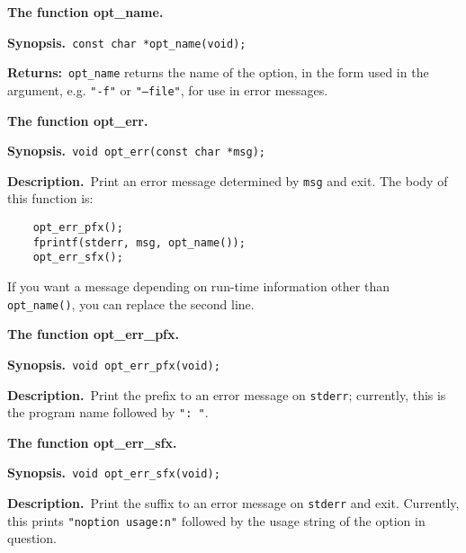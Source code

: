 \documentclass{article}
\newenvironment{chunk}[1]
{\par\smallskip\noindent\textbf{#1.}\par\nopagebreak}
{\par\smallskip}
\renewcommand{\tt}{\texttt}
\newcommand{\synopsis}{\par\noindent\textbf{Synopsis.}}
\newcommand{\descr}{\par\noindent\textbf{Description.}\ }
\newcommand{\return}{\par\noindent\textbf{Returns:}\ }
\newcommand{\bsl}{\symbol{92}}
\begin{document}
\begin{chunk}{The function opt\_name}
  \synopsis\verb+ const char *opt_name(void);+
  \return \tt{opt\_name} returns the name of the option, in
  the form used in the argument, e.g. \tt{"-f"} or \tt{"--file"}, for
  use in error messages.
\end{chunk}
\begin{chunk}{The function opt\_err}
  \synopsis\verb+ void opt_err(const char *msg);+
  \descr Print an error message determined by \tt{msg} and exit. The
  body of this function is:
\begin{verbatim}
    opt_err_pfx();
    fprintf(stderr, msg, opt_name());
    opt_err_sfx();
\end{verbatim}
  If you want a message depending on run-time information other than
  \tt{opt\_name()}, you can replace the second line.
\end{chunk}
\begin{chunk} {The function opt\_err\_pfx}
  \synopsis\verb+ void opt_err_pfx(void);+
  \descr Print the prefix to an error message on \tt{stderr};
  currently, this is the program name followed by \verb*+": "+. 
\end{chunk}
\begin{chunk} {The function opt\_err\_sfx}
  \synopsis\verb+ void opt_err_sfx(void);+
  \descr Print the suffix to an error message on \tt{stderr}
  and exit. Currently, this prints \tt{"\bsl noption usage:\bsl n"}
  followed by the usage string of the option in  question.
\end{chunk}
\end{document}
